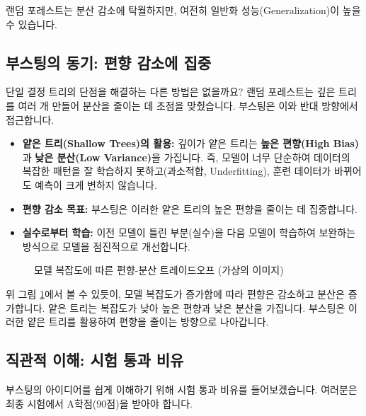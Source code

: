 \documentclass[11pt,a4paper]{article}
\theoremstyle{definition}
\begin{document}
랜덤 포레스트는 분산 감소에 탁월하지만, 여전히 일반화 성능(Generalization)이 높을 수 있습니다.

\subsection{부스팅의 동기: 편향 감소에 집중}
단일 결정 트리의 단점을 해결하는 다른 방법은 없을까요? 랜덤 포레스트는 깊은 트리를 여러 개 만들어 분산을 줄이는 데 초점을 맞췄습니다. 부스팅은 이와 반대 방향에서 접근합니다.

\begin{tcolorbox}[summary, title={부스팅의 핵심 동기}] %
\begin{itemize}
    \item \textbf{얕은 트리(Shallow Trees)의 활용:} 깊이가 얕은 트리는 \textbf{높은 편향(High Bias)}과 \textbf{낮은 분산(Low Variance)}을 가집니다. 즉, 모델이 너무 단순하여 데이터의 복잡한 패턴을 잘 학습하지 못하고(과소적합, Underfitting), 훈련 데이터가 바뀌어도 예측이 크게 변하지 않습니다.
    \item \textbf{편향 감소 목표:} 부스팅은 이러한 얕은 트리의 높은 편향을 줄이는 데 집중합니다.
    \item \textbf{실수로부터 학습:} 이전 모델이 틀린 부분(실수)을 다음 모델이 학습하여 보완하는 방식으로 모델을 점진적으로 개선합니다.
\end{itemize}
\end{tcolorbox}

\begin{figure}[h!]
    \centering
    \caption{모델 복잡도에 따른 편향-분산 트레이드오프 (가상의 이미지)}
    \label{fig:bias_variance_tradeoff}
\end{figure}

위 그림 \ref{fig:bias_variance_tradeoff}에서 볼 수 있듯이, 모델 복잡도가 증가함에 따라 편향은 감소하고 분산은 증가합니다. 얕은 트리는 복잡도가 낮아 높은 편향과 낮은 분산을 가집니다. 부스팅은 이러한 얕은 트리를 활용하여 편향을 줄이는 방향으로 나아갑니다.

\subsection{직관적 이해: 시험 통과 비유}
부스팅의 아이디어를 쉽게 이해하기 위해 시험 통과 비유를 들어보겠습니다. 여러분은 최종 시험에서 A학점(90점)을 받아야 합니다.
\end{document}
